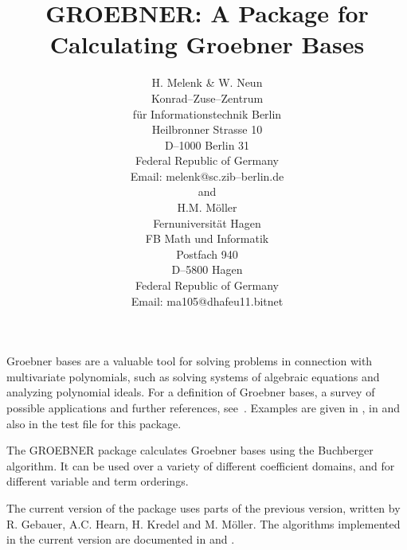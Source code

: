 \title{GROEBNER: A Package for Calculating Groebner Bases}
\date{}
\author{
H. Melenk \& W. Neun \\[0.05in]
Konrad--Zuse--Zentrum \\
f\"ur Informationstechnik Berlin \\
Heilbronner Strasse 10 \\
D--1000 Berlin 31 \\
Federal Republic of Germany \\[0.05in]
Email:  melenk@sc.zib--berlin.de \\[0.05in]
and \\[0.05in]
H.M. M\"oller \\[0.05in]
Fernuniversit\"at Hagen \\
FB Math und Informatik\\
Postfach 940 \\
D--5800 Hagen \\
Federal Republic of Germany\\[0.05in]
Email: ma105@dhafeu11.bitnet}


\maketitle

Groebner bases are a valuable tool for solving problems in
connection with multivariate polynomials, such as solving systems of
algebraic equations and analyzing polynomial ideals. For a definition
of Groebner bases, a survey of possible applications and further
references, see~\cite{Buchberger:85}. Examples are given in \cite{Boege:86},
in \cite{Buchberger:88} and also in the test file for this package.

 
The GROEBNER package calculates Groebner bases using the
Buchberger algorithm.  It can be used over a variety of different
coefficient domains, and for different variable and term orderings.

The current version of the package uses parts of the previous
version, written by  R. Gebauer, A.C. Hearn, H. Kredel and M.
M\"oller. The algorithms implemented in the current version are
documented in \cite{Faugere:89} and \cite{Gebauer:88}.

